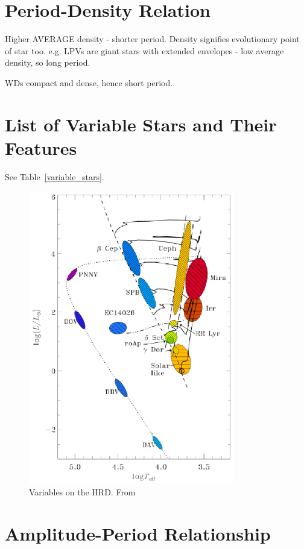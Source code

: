 \documentclass{spy}
\begin{document}
\section{Period-Density Relation}
Higher AVERAGE density - shorter period. Density signifies evolutionary point of star too. 
e.g. LPVs are giant stars with extended envelopes - low average density, so long period.

WDs compact and dense, hence short period. 


\section{List of Variable Stars and Their Features}
See Table~\ref{variable_stars}.

\begin{figure}[ht]
    \centering
    \includegraphics[width=0.8\textwidth]{hrd_variables.eps}
    \caption{Variables on the HRD. From \citet{MiraVariablesPeriod}}
    \label{hrd_variables_diagram}
\end{figure}


\section{Amplitude-Period Relationship}
\end{document}
